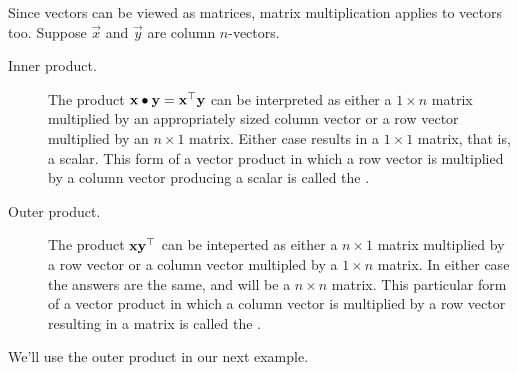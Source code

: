 \documentclass{ximera}
\begin{document}
Since vectors can be viewed as matrices, matrix multiplication applies
to vectors too. Suppose $\vec{x}$ and $\vec y$ are column $n$-vectors.
\begin{description}
\item[Inner product.] The product $\mathbf{x}\bullet\mathbf{y} =
  \mathbf{x}^\top \mathbf{y}$ can be interpreted as either a $1 \times
  n$ matrix multiplied by an appropriately sized column vector or a
  row vector multiplied by an $n \times 1$ matrix. Either case results
  in a $1 \times 1$ matrix, that is, a scalar. This form of a vector
  product in which a row vector is multiplied by a column vector
  producing a scalar is called the .
\item[Outer product.] The product $\mathbf{x} \mathbf{y}^\top$ can be
  inteperted as either a $n\times 1$ matrix multiplied by a row vector or a
  column vector multipled by a $1\times n$ matrix. In either case the
  answers are the same, and will be a $n\times n$ matrix. This particular
  form of a vector product in which a column vector is multiplied by a
  row vector resulting in a matrix is called the .
\end{description}



We'll use the outer product in our next example.
\end{document}
